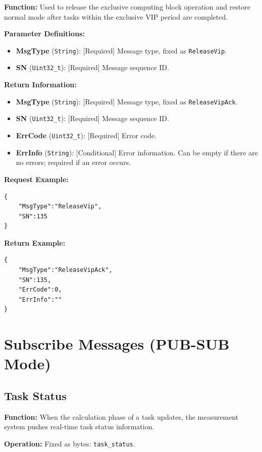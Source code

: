\documentclass[12pt, a4paper]{article}
\begin{document}
\textbf{Function:} Used to release the exclusive computing block operation and restore normal mode after tasks within the exclusive VIP period are completed.

\textbf{Parameter Definitions:}
\begin{itemize}
    \item \textbf{MsgType} (\texttt{String}): [Required] Message type, fixed as \texttt{ReleaseVip}.
    \item \textbf{SN} (\texttt{Uint32\_t}): [Required] Message sequence ID.
\end{itemize}

\textbf{Return Information:}
\begin{itemize}
    \item \textbf{MsgType} (\texttt{String}): [Required] Message type, fixed as \texttt{ReleaseVipAck}.
    \item \textbf{SN} (\texttt{Uint32\_t}): [Required] Message sequence ID.
    \item \textbf{ErrCode} (\texttt{Uint32\_t}): [Required] Error code.
    \item \textbf{ErrInfo} (\texttt{String}): [Conditional] Error information. Can be empty if there are no errors; required if an error occurs.
\end{itemize}

\noindent \textbf{Request Example:}
\begin{lstlisting}
{
    "MsgType":"ReleaseVip",
    "SN":135
}
\end{lstlisting}

\noindent \textbf{Return Example:}
\begin{lstlisting}
{
    "MsgType":"ReleaseVipAck",
    "SN":135,
    "ErrCode":0,
    "ErrInfo":""
}
\end{lstlisting}

\section{Subscribe Messages (PUB-SUB Mode)}

\subsection{Task Status}

\textbf{Function:} When the calculation phase of a task updates, the measurement system pushes real-time task status information.

\textbf{Operation:} Fixed as bytes: \texttt{task\_status}.
\end{document}
